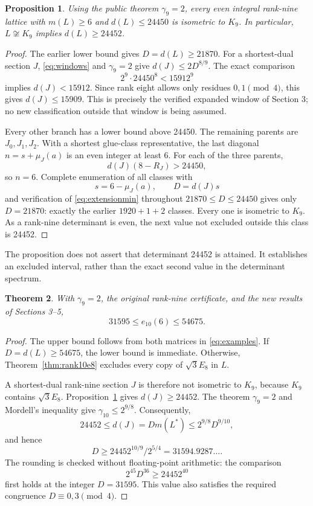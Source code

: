 \documentclass[11pt,a4paper]{article}
\newtheorem{theorem}{Theorem}[section]
\newtheorem{proposition}[theorem]{Proposition}
\theoremstyle{remark}\newtheorem{remark}[theorem]{Remark}
\begin{document}
\begin{proposition}\label{prop:gap}
Using the public theorem $\gamma_9=2$, every even integral rank-nine lattice with $m(L)\ge6$ and $d(L)\le24450$ is isometric to $K_9$. In particular, $L\not\cong K_9$ implies $d(L)\ge24452$.
\end{proposition}

\begin{proof}
The earlier lower bound gives $D=d(L)\ge21870$. For a shortest-dual section $J$, \eqref{eq:windows} and $\gamma_9=2$ give $d(J)\le2D^{8/9}$. The exact comparison
\[
2^9\cdot24450^8<15912^9
\]
implies $d(J)<15912$. Since rank eight allows only residues $0,1\pmod4$, this gives $d(J)\le15909$. This is precisely the verified expanded window of Section 3; no new classification outside that window is being assumed.

Every other branch has a lower bound above 24450. The remaining parents are $J_0,J_1,J_2$. With a shortest glue-class representative, the last diagonal $n=s+\mu_J(a)$ is an even integer at least 6. For each of the three parents,
\[
d(J)(8-R_J)>24450,
\]
so $n=6$. Complete enumeration of all classes with
\[
s=6-\mu_J(a),\qquad D=d(J)s
\]
and verification of \eqref{eq:extensionmin} throughout $21870\le D\le24450$ gives only $D=21870$: exactly the earlier $1920+1+2$ classes. Every one is isometric to $K_9$. As a rank-nine determinant is even, the next value not excluded outside this class is 24452.
\end{proof}

The proposition does not assert that determinant 24452 is attained. It establishes an excluded interval, rather than the exact second value in the determinant spectrum.

\begin{theorem}\label{thm:global10}
With $\gamma_9=2$, the original rank-nine certificate, and the new results of Sections 3--5,
\[
\boxed{31595\le e_{10}(6)\le54675}.
\]
\end{theorem}

\begin{proof}
The upper bound follows from both matrices in \eqref{eq:examples}. If $D=d(L)\ge54675$, the lower bound is immediate. Otherwise, Theorem~\ref{thm:rank10e8} excludes every copy of $\sqrt3E_8$ in $L$.

A shortest-dual rank-nine section $J$ is therefore not isometric to $K_9$, because $K_9$ contains $\sqrt3E_8$. Proposition~\ref{prop:gap} gives $d(J)\ge24452$. The theorem $\gamma_9=2$ and Mordell's inequality give $\gamma_{10}\le2^{9/8}$. Consequently,
\[
24452\le d(J)=D m(L^*)\le2^{9/8}D^{9/10},
\]
and hence
\[
D\ge24452^{10/9}/2^{5/4}=31594.9287\ldots.
\]
The rounding is checked without floating-point arithmetic: the comparison
\[
2^{45}D^{36}\ge24452^{40}
\]
first holds at the integer $D=31595$. This value also satisfies the required congruence $D\equiv0,3\pmod4$.
\end{proof}
\end{document}
